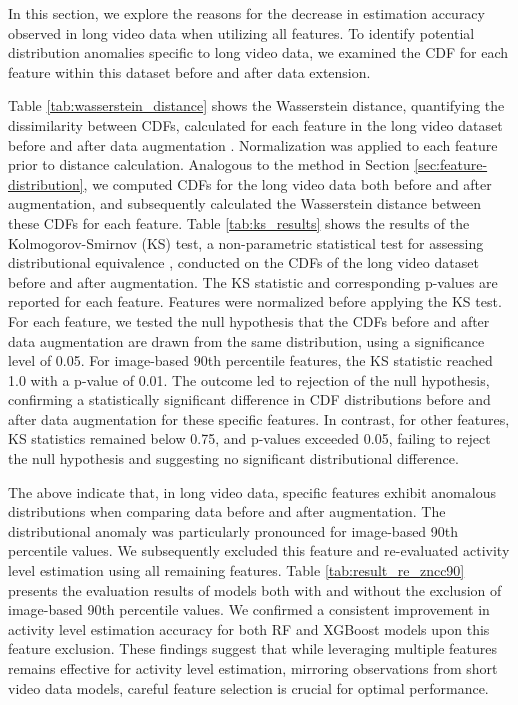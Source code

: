%
In this section, we explore the reasons for the decrease in estimation accuracy observed in long video data when utilizing all features.
% 
To identify potential distribution anomalies specific to long video data, we examined the CDF for each feature within this dataset before and after data extension.   

% 
Table \ref{tab:wasserstein_distance} shows the Wasserstein distance, quantifying the dissimilarity between CDFs, calculated for each feature in the long video dataset before and after data augmentation \cite{panaretos2019statistical}.
% 
Normalization was applied to each feature prior to distance calculation. 
% 
Analogous to the method in Section \ref{sec:feature-distribution}, we computed CDFs for the long video data both before and after augmentation, and subsequently calculated the Wasserstein distance between these CDFs for each feature.
% 
Table \ref{tab:ks_results} shows the results of the Kolmogorov-Smirnov (KS) test, a non-parametric statistical test for assessing distributional equivalence \cite{berger2014kolmogorov}, conducted on the CDFs of the long video dataset before and after augmentation.
% 
The KS statistic and corresponding p-values are reported for each feature.
% 
Features were normalized before applying the KS test.
% 
For each feature, we tested the null hypothesis that the CDFs before and after data augmentation are drawn from the same distribution, using a significance level of 0.05. 
% 
For image-based 90th percentile features, the KS statistic reached 1.0 with a p-value of 0.01.
% 
The outcome led to rejection of the null hypothesis, confirming a statistically significant difference in CDF distributions before and after data augmentation for these specific features. 
% 
In contrast, for other features, KS statistics remained below 0.75, and p-values exceeded 0.05, failing to reject the null hypothesis and suggesting no significant distributional difference.   

% 
The above indicate that, in long video data, specific features exhibit anomalous distributions when comparing data before and after augmentation.
% 
The distributional anomaly was particularly pronounced for image-based 90th percentile values.
% 
We subsequently excluded this feature and re-evaluated activity level estimation using all remaining features. 
% 
Table \ref{tab:result_re_zncc90} presents the evaluation results of models both with and without the exclusion of image-based 90th percentile values.
% 
We confirmed a consistent improvement in activity level estimation accuracy for both RF and XGBoost models upon this feature exclusion.  
% 
These findings suggest that while leveraging multiple features remains effective for activity level estimation, mirroring observations from short video data models, careful feature selection is crucial for optimal performance.
